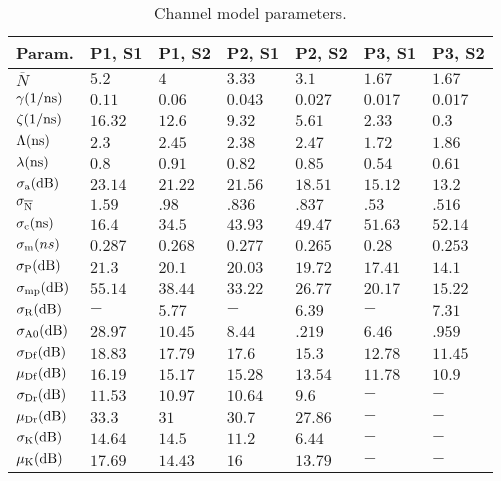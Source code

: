 \documentclass[conference]{IEEEtran}
\begin{document}
\begin{table}[!t]
	\begin{center}
		\caption{Channel model parameters.}\label{Table_IV}
        \vspace{-0.4 cm}
		\begin{tabular}{@{} |P{1cm}|P{0.82cm}|P{0.82cm}|P{0.82cm}|P{0.82cm}|P{0.82cm}|P{0.82cm}| @{}}
			\hline
			\textbf{Param.}&\textbf{P1, S1}&\textbf{P1, S2}&\textbf{P2, S1}&\textbf{P2, S2}&\textbf{P3, S1}&\textbf{P3, S2}\\			
			\hline
			$\overline N$&$5.2$&$4$&$3.33$&$3.1$&$1.67$&$1.67$ \\
			\hline
			$\gamma({\rm 1/ns})$&$0.11$&$0.06$&$0.043$&$0.027$&$0.017$&$0.017$\\
			\hline
			$\zeta({\rm 1/ns})$&$16.32$&$12.6$&$9.32$&$5.61$&$2.33$&$0.3$\\
			\hline
			$\Lambda({\rm ns})$&$2.3$&$2.45$&$2.38$&$2.47$&$1.72$&$1.86$ \\
			\hline
			$\lambda({\rm ns})$&$0.8$&$0.91$&$0.82$&$0.85$&$0.54$&$0.61$ \\
			\hline
            $\sigma_{\rm a}(\rm dB)$&$23.14$&$21.22$&$21.56$&$18.51$&$15.12$&$13.2$ \\
			\hline
			$\sigma_{\rm \overline N}$&$1.59$&$.98$&$.836$&$.837$&$.53$&$.516$\\
			\hline	
			$\sigma_{\rm c}({\rm ns})$&$16.4$&$34.5$&$43.93$&$49.47$&$51.63$&$52.14$\\
			\hline
			$\sigma_{\rm m}(ns)$&$0.287$&$0.268$&$0.277$&$0.265$&$0.28$&$0.253$\\
			\hline
			$\sigma_{\rm P}({\rm dB})$&$21.3$&$20.1$&$20.03$&$19.72$&$17.41$&$14.1$ \\
			\hline
			$\sigma_{\rm mp}({\rm dB})$&$55.14$&$38.44$&$33.22$&$26.77$&$20.17$&$15.22$\\
			\hline
			$\sigma_{\rm R}({\rm dB})$&$-$&$5.77$&$-$&$6.39$&$-$&$7.31$\\
			\hline			
			$\sigma_{\rm A0}({\rm dB})$&$28.97$&$10.45$&$8.44$&$.219$&$6.46$&$.959$\\
			\hline
			$\sigma_{\rm Df}({\rm dB})$&$18.83$&$17.79$&$17.6$&$15.3$&$12.78$&$11.45$\\
			\hline
            $\mu_{\rm Df}({\rm dB})$&$16.19$&$15.17$&$15.28$&$13.54$&$11.78$&$10.9$\\
			\hline         
            $\sigma_{\rm Dr}({\rm dB})$&$11.53$&$10.97$&$10.64$&$9.6$&$-$&$-$\\
			\hline
            $\mu_{\rm Dr}({\rm dB})$&$33.3$&$31$&$30.7$&$27.86$&$-$&$-$\\
			\hline
            $\sigma_{\rm K}({\rm dB})$&$14.64$&$14.5$&$11.2$&$6.44$&$-$&$-$\\
			\hline
			$\mu_{\rm K}({\rm dB})$&$17.69$&$14.43$&$16$&$13.79$&$-$&$-$\\
			\hline 
	\end{tabular}
		\end{center}
\vspace{-0.4 cm}
\end{table}
\end{document}
